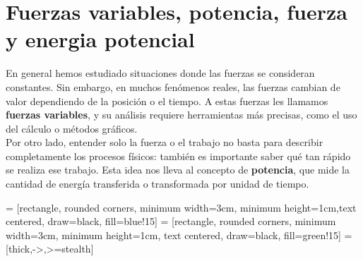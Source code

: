 \setcounter{page}{84}
\setcounter{figure}{0}
\setcounter{chapter}{9}

\raggedright 

\chapter{Fuerzas variables, potencia, fuerza y energia potencial }
\label{cap:cap10}
\vspace{-15ex}

\raggedright
En general hemos estudiado situaciones donde las fuerzas se consideran constantes. Sin embargo, en muchos fenómenos reales, las fuerzas cambian de valor dependiendo de la posición o el tiempo. A estas fuerzas les llamamos \textbf{fuerzas variables}, y su análisis requiere herramientas más precisas, como el uso del cálculo o métodos gráficos. \\[.35cm]

Por otro lado, entender solo la fuerza o el trabajo no basta para describir completamente los procesos físicos: también es importante saber qué tan rápido se realiza ese trabajo. Esta idea nos lleva al concepto de \textbf{potencia}, que mide la cantidad de energía transferida o transformada por unidad de tiempo.


 = [rectangle, rounded corners, minimum width=3cm, minimum height=1cm,text centered, draw=black, fill=blue!15]
 = [rectangle, rounded corners, minimum width=3cm, minimum height=1cm, text centered, draw=black, fill=green!15]
 = [thick,->,>=stealth]



